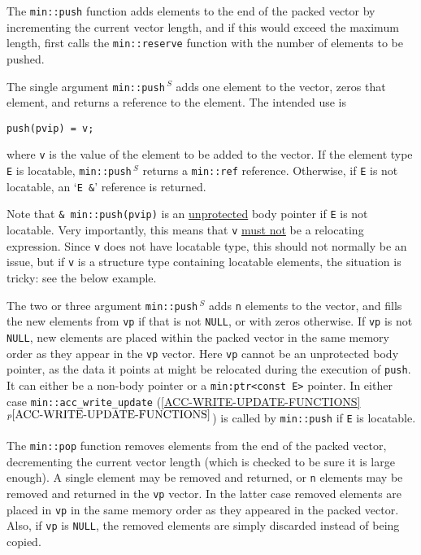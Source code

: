 \documentclass[12pt]{article}
\newcommand{\itemref}[1]{\ref{#1}$^{p\pageref{#1}}$}
\newcommand{\EOL}{\penalty \exhyphenpenalty}
\newenvironment{indpar}[1][0.3in]%
	{\begin{list}{}%
		     {\setlength{\itemsep}{0in}%
		      \setlength{\topsep}{0in}%
		      \setlength{\parsep}{1ex}%
		      \setlength{\labelwidth}{#1}%
		      \setlength{\leftmargin}{#1}%
		      \addtolength{\leftmargin}{\labelsep}}%
	 \item}%
	{\end{list}}
\newcommand{\RESIZE}{$\,^S$}
\begin{document}
The \verb|min::push| function adds elements
to the end of the packed vector
by incrementing the current vector length, and if this would
exceed the maximum length, first calls the \verb|min::reserve| function
with the number of elements to be pushed.

The single argument {\tt min::\EOL push\RESIZE} adds one element to the vector,
zeros that element, and returns a reference to the element.  The
intended use is
\begin{indpar}\begin{verbatim}
push(pvip) = v;
\end{verbatim}\end{indpar}
where \verb|v| is the value of the element to be added to the vector.
If the element type {\tt E} is locatable, {\tt min::\EOL push\RESIZE}
returns a {\tt min::\EOL ref\TARG} reference.%
\label{PACKED_VEC_PUSH_REF}
Otherwise, if {\tt E} is not locatable, an
`{\tt E \&}' reference is returned.

Note that {\tt \& min::push(pvip)}
is an \underline{unprotected} body pointer if {\tt E} is not
locatable.
Very importantly, this means that {\tt v} \underline{must not}
be a relocating expression.  Since {\tt v} does not have locatable type,
this should not normally be an issue, but if {\tt v} is
a structure type containing locatable elements, the situation is
tricky: see the below example.

The two or three argument {\tt min::\EOL push\RESIZE} adds {\tt n}
elements to the vector, and fills the new elements from {\tt vp}
if that is not {\tt NULL}, or with zeros otherwise.
If \verb|vp| is not \verb|NULL|,
new elements are placed within the packed vector in the same
memory order as they appear in the \verb|vp| vector.
Here \verb|vp| cannot be an unprotected body pointer, as the data
it points at might be relocated during the execution of {\tt push}.
It can either be a non-body pointer or a {\tt min:\EOL ptr<const E>} pointer.
In either case {\tt min::\EOL acc\_\EOL write\_\EOL update} 
(\itemref{ACC-WRITE-UPDATE-FUNCTIONS})
is called by {\tt min::\EOL push} if {\tt E} is locatable.

The \verb|min::pop| function removes elements from the end of the
packed vector, decrementing the current vector length (which is checked
to be sure it is large enough).   A single element may be removed and
returned, or \verb|n| elements may be removed and returned in the
\verb|vp| vector.  In the latter case removed elements are placed in
\verb|vp| in the same memory order as they appeared in the packed vector.
Also,
if \verb|vp| is \verb|NULL|, the removed elements are simply discarded
instead of being copied.
\end{document}
